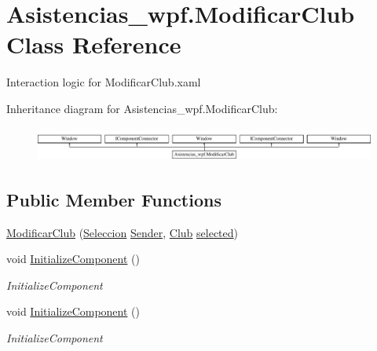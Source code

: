 \hypertarget{class_asistencias__wpf_1_1_modificar_club}{\section{Asistencias\-\_\-wpf.\-Modificar\-Club Class Reference}
\label{class_asistencias__wpf_1_1_modificar_club}
}


Interaction logic for Modificar\-Club.\-xaml  


Inheritance diagram for Asistencias\-\_\-wpf.\-Modificar\-Club\-:\begin{figure}[H]
\begin{center}
\leavevmode
\includegraphics[height=1.148718cm]{d6/da6/class_asistencias__wpf_1_1_modificar_club}
\end{center}
\end{figure}
\subsection*{Public Member Functions}
\begin{DoxyCompactItemize}
\item 
\hyperlink{class_asistencias__wpf_1_1_modificar_club_a3b773638e7caf4f49a50abc6d9464020}{Modificar\-Club} (\hyperlink{class_asistencias__wpf_1_1_seleccion}{Seleccion} \hyperlink{class_asistencias__wpf_1_1_modificar_club_a17c1749aa4cdc0bc9697d3a9ebc14b1a}{Sender}, \hyperlink{class_asistencias__wpf_1_1_club}{Club} \hyperlink{class_asistencias__wpf_1_1_modificar_club_ad8a6d484077e99675c010a8d3a98de61}{selected})
\item 
void \hyperlink{class_asistencias__wpf_1_1_modificar_club_a50a572eb21cc3d7cf74116bb3ac1535a}{Initialize\-Component} ()
\begin{DoxyCompactList}\small\item\em Initialize\-Component \end{DoxyCompactList}\item 
void \hyperlink{class_asistencias__wpf_1_1_modificar_club_a50a572eb21cc3d7cf74116bb3ac1535a}{Initialize\-Component} ()
\begin{DoxyCompactList}\small\item\em Initialize\-Component \end{DoxyCompactList}\end{DoxyCompactItemize}
